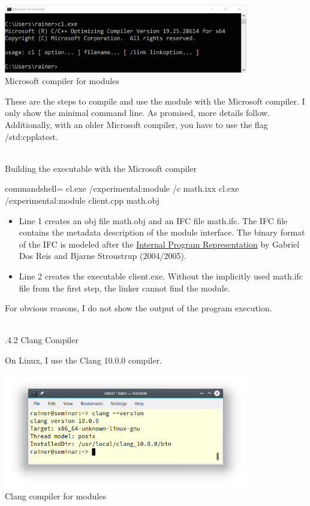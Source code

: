 \begin{center}
\includegraphics[width=0.8\textwidth]{content/3/chapter4/images/18.png}\\
Microsoft compiler for modules
\end{center}

These are the steps to compile and use the module with the Microsoft compiler. I only show the minimal command line. As promised, more details follow. Additionally, with an older Microsoft compiler, you have to use the flag /std:cpplatest.

\hspace*{\fill} \\ %
\noindent
Building the executable with the Microsoft compiler
\begin{tcblisting}{commandshell={}}
cl.exe /experimental:module /c math.ixx
cl.exe /experimental:module client.cpp math.obj
\end{tcblisting}

\begin{itemize}
\item 
Line 1 creates an obj file math.obj and an IFC file math.ifc. The IFC file contains the metadata description of the module interface. The binary format of the IFC is modeled after the \href{https://www.stroustrup.com/gdr-bs-macis09.pdf}{Internal Program Representation} by Gabriel Dos Reis and Bjarne Stroustrup (2004/2005).

\item 
Line 2 creates the executable client.exe. Without the implicitly used math.ifc file from the first step, the linker cannot find the module.
\end{itemize}

For obvious reasons, I do not show the output of the program execution.

\hspace*{\fill} \\ %
.4.2\hspace{0.2cm} Clang Compiler

On Linux, I use the Clang 10.0.0 compiler.

\begin{center}
\includegraphics[width=0.8\textwidth]{content/3/chapter4/images/19.png}\\
Clang compiler for modules
\end{center}

